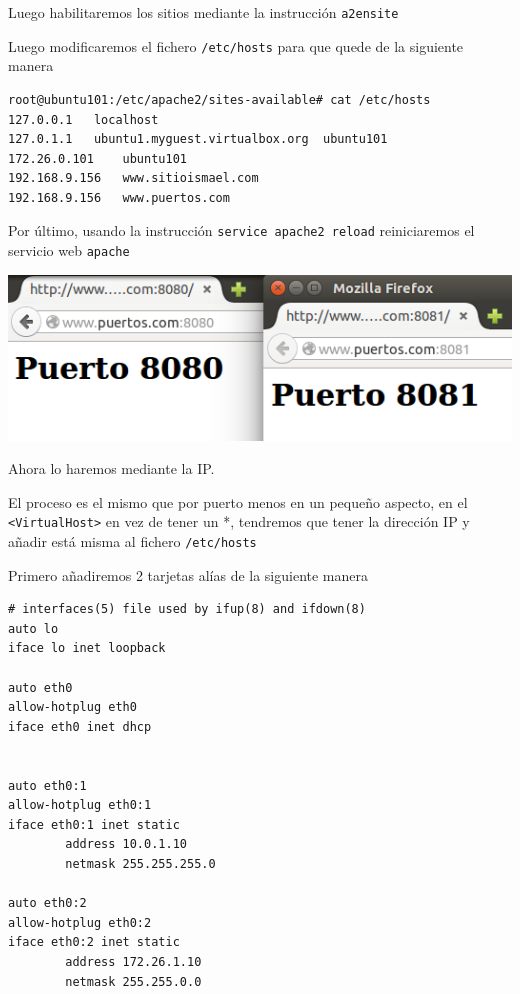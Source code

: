 \documentclass[11pt]{article}
\begin{document}
Luego habilitaremos los sitios mediante la instrucción \texttt{a2ensite}

Luego modificaremos el fichero \texttt{/etc/hosts} para que quede de la siguiente manera
\begin{verbatim}
root@ubuntu101:/etc/apache2/sites-available# cat /etc/hosts
127.0.0.1	localhost
127.0.1.1	ubuntu1.myguest.virtualbox.org	ubuntu101
172.26.0.101	ubuntu101
192.168.9.156	www.sitioismael.com
192.168.9.156	www.puertos.com
\end{verbatim}

Por último, usando la instrucción \texttt{service apache2 reload} reiniciaremos el servicio web \texttt{apache}

\begin{center}
\includegraphics[width=.9\linewidth]{./media/apache-7.png}
\end{center}

Ahora lo haremos mediante la IP.

El proceso es el mismo que por puerto menos en un pequeño aspecto, en el \texttt{<VirtualHost>} en vez de tener un *, tendremos que tener la dirección IP y añadir está misma al fichero \texttt{/etc/hosts}

Primero añadiremos 2 tarjetas alías de la siguiente manera
\begin{verbatim}
# interfaces(5) file used by ifup(8) and ifdown(8)
auto lo
iface lo inet loopback

auto eth0
allow-hotplug eth0
iface eth0 inet dhcp


auto eth0:1
allow-hotplug eth0:1
iface eth0:1 inet static
        address 10.0.1.10
        netmask 255.255.255.0

auto eth0:2
allow-hotplug eth0:2
iface eth0:2 inet static
        address 172.26.1.10
        netmask 255.255.0.0
\end{verbatim}
\end{document}
